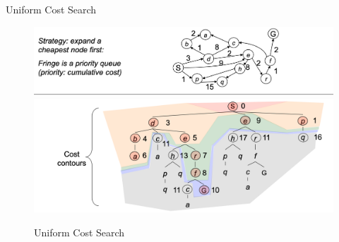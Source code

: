 \documentclass{beamer}
\begin{document}
\begin{frame}{Uniform Cost Search}
    \begin{figure}[htpb]
        \centering
        \includegraphics[width=1\linewidth]{pic/ucs-u.png}
        \pause
        \includegraphics[width=1\linewidth]{pic/ucs-d.png}
        \caption{Uniform Cost Search}
    \end{figure}
\end{frame}
\end{document}
